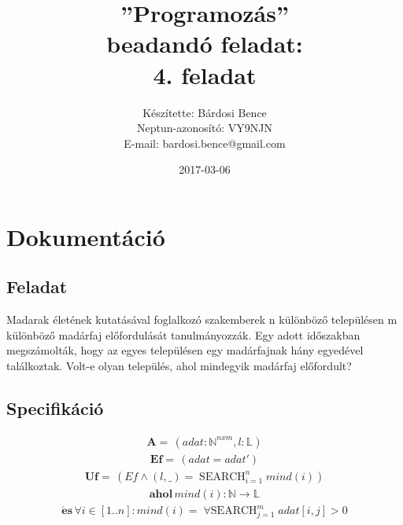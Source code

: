 \documentclass[a4paper]{article}
\title{”Programozás”\\ beadandó feladat:\\ 4. feladat}
\date{2017-03-06}
\author{Készítette: Bárdosi Bence\\ Neptun-azonosító: VY9NJN\\ E-mail: bardosi.bence@gmail.com}
\DeclareMathOperator*{\search}{SEARCH}
\DeclareMathOperator*{\mindSearch}{\forall SEARCH}
\begin{document}
  \maketitle
  \newpage

  \tableofcontents
  \newpage

  \section{Dokumentáció}
    \subsection{Feladat}
    Madarak életének kutatásával foglalkozó szakemberek n különböző településen m különböző madárfaj előfordulását tanulmányozzák. Egy adott időszakban megszámolták, hogy az egyes településen egy madárfajnak hány egyedével találkoztak.
    Volt-e olyan település, ahol mindegyik madárfaj előfordult?
    \subsection{Specifikáció}
        \begin{align*}
          \mathbf{A=}\, \left ( adat: \mathbb{N}^{n x m} , l: \mathbb{L} \right )
        \end{align*}
        \begin{align*}
          \mathbf{Ef=}\, \left ( adat=adat' \right )
        \end{align*}
        \begin{align*}
          \mathbf{Uf=}\, \left ( Ef \wedge (l,\_)=\search_{i=1}^n mind(i) \right )
        \end{align*}
        \begin{align*}
          \mathbf{ahol}\, mind(i): \mathbb{N} \rightarrow \mathbb{L}
        \end{align*}
        \begin{align*}
          \mathbf{\acute{e}s}\, \forall i \in [1..n]: mind(i)=\mindSearch_{j=1}^{m} adat[i,j]>0
        \end{align*}
\end{document}
